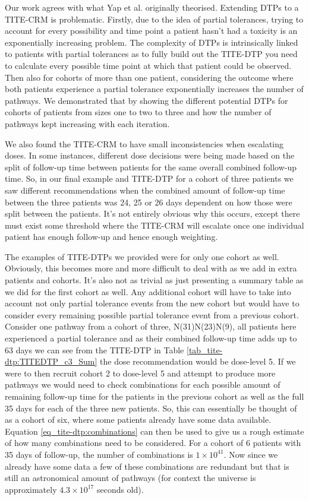 Our work agrees with what Yap et al. \cite{yapDoseTransitionPathways2017} originally theorised. Extending DTPs to a TITE-CRM is problematic. Firstly, due to the idea of partial tolerances, trying to account for every possibility and time point a patient hasn't had a toxicity is an exponentially increasing problem. The complexity of DTPs is intrinsically linked to patients with partial tolerances as to fully build out the TITE-DTP you need to calculate every possible time point at which that patient could be observed. Then also for cohorts of more than one patient, considering the outcome where both patients experience a partial tolerance exponentially increases the number of pathways. We demonstrated that by showing the different potential DTPs for cohorts of patients from sizes one to two to three and how the number of pathways kept increasing with each iteration. 

We also found the TITE-CRM to have small inconsistencies when escalating doses. In some instances, different dose decisions were being made based on the split of follow-up time between patients for the same overall combined follow-up time. So, in our final example and TITE-DTP for a cohort of three patients we saw different recommendations when the combined amount of follow-up time between the three patients was 24, 25 or 26 days dependent on how those were split between the patients. It's not entirely obvious why this occurs, except there must exist some threshold where the TITE-CRM will escalate once one individual patient has enough follow-up and hence enough weighting. 

The examples of TITE-DTPs we provided were for only one cohort as well. Obviously, this becomes more and more difficult to deal with as we add in extra patients and cohorts. It's also not as trivial as just presenting a summary table as we did for the first cohort as well. Any additional cohort will have to take into account not only partial tolerance events from the new cohort but would have to consider every remaining possible partial tolerance event from a previous cohort. Consider one pathway from a cohort of three, N(31)N(23)N(9), all patients here experienced a partial tolerance and as their combined follow-up time adds up to 63 days we can see from the TITE-DTP in Table \ref{tab_tite-dtp:TITEDTP_c3_Sum} the dose recommendation would be dose-level 5. If we were to then recruit cohort 2 to dose-level 5 and attempt to produce more pathways we would need to check combinations for each possible amount of remaining follow-up time for the patients in the previous cohort as well as the full 35 days for each of the three new patients. So, this can essentially be thought of as a cohort of six, where some patients already have some data available. Equation \ref{eq_tite-dtp:combinations} can then be used to give us a rough estimate of how many combinations need to be considered. For a cohort of 6 patients with 35 days of follow-up, the number of combinations is $1 \times 10^{41}$. Now since we already have some data a few of these combinations are redundant but that is still an astronomical amount of pathways (for context the universe is approximately $4.3 \times 10^{17}$ seconds old). 

